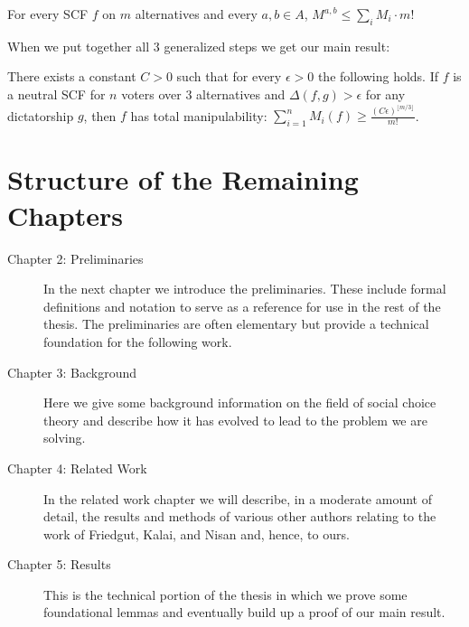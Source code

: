	\begin{lemma}
		For every SCF $f$ on $m$ alternatives and every $a,b \in A$, $M^{a,b} \le \sum_i M_i \cdot m!$
	\end{lemma}

	When we put together all 3 generalized steps we get our main result:
	\begin{theorem}
		There exists a constant $C > 0$ such that for every $\epsilon > 0$ the following holds. If $f$ is a neutral SCF for $n$ voters over 3 alternatives and $\Delta(f, g) > \epsilon$ for any dictatorship $g$, then $f$ has total manipulability: $\sum^n_{i=1} M_i(f) \ge \frac{(C\epsilon)^{\lfloor m/3 \rfloor}}{m!}$.
	\end{theorem}


\section{Structure of the Remaining Chapters}

	\begin{description}
		\item[Chapter 2: Preliminaries] In the next chapter we introduce the preliminaries. These include formal definitions and notation to serve as a reference for use in the rest of the thesis. The preliminaries are often elementary but provide a technical foundation for the following work.

		\item[Chapter 3: Background] Here we give some background information on the field of social choice theory and describe how it has evolved to lead to the problem we are solving.

		\item[Chapter 4: Related Work] In the related work chapter we will describe, in a moderate amount of detail, the results and methods of various other authors relating to the work of Friedgut, Kalai, and Nisan and, hence, to ours.

		\item[Chapter 5: Results] This is the technical portion of the thesis in which we prove some foundational lemmas and eventually build up a proof of our main result.
	\end{description}
